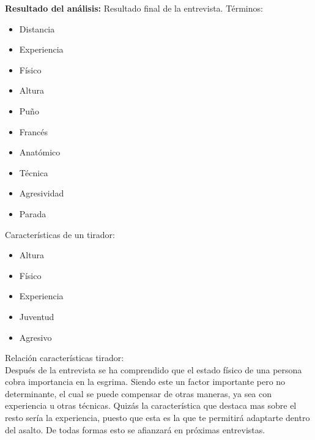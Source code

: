 \textbf{Resultado del análisis:} Resultado final de la entrevista.
Términos:
\begin{itemize}
  \item Distancia
  \item Experiencia
  \item Físico
  \item Altura
  \item Puño
  \item Francés
  \item Anatómico
  \item Técnica
  \item Agresividad
  \item Parada
\end{itemize}

Características de un tirador:
\begin{itemize}
  \item Altura
  \item Físico
  \item Experiencia
  \item Juventud
  \item Agresivo
\end{itemize}

Relación características tirador: \\
Después de la entrevista se ha comprendido que el estado físico de una persona cobra importancia
 en la esgrima. Siendo este un factor importante pero no determinante, el cual se puede
 compensar de otras maneras, ya sea con experiencia u otras técnicas. Quizás la característica
 que destaca mas sobre el resto sería la experiencia, puesto que esta es la que te permitirá
 adaptarte dentro del asalto. De todas formas esto se afianzará en próximas entrevistas.

